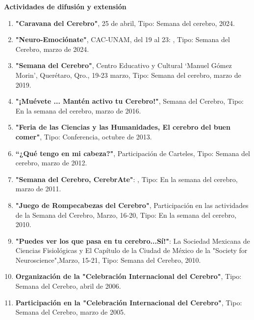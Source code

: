 \textbf{Actividades de difusión y extensión}

\begin{enumerate}

\item \textbf{"Caravana del Cerebro"}, 25 de abril, Tipo: Semana del cerebro, 2024.

\item \textbf{"Neuro-Emociónate"}, CAC-UNAM, del 19 al 23: , Tipo: Semana del Cerebro, marzo de 2024.

\item  \textbf{"Semana del Cerebro"}, Centro Educativo y Cultural ‘Manuel Gómez Morin’, Querétaro, Qro., 19-23 marzo, Tipo: Semana del 
cerebro, marzo de 2019.

\item  \textbf{"¡Muévete ... Mantén activo tu Cerebro!"}, Semana del Cerebro, Tipo: En la semana del cerebro, marzo de 2016.

\item  \textbf{"Feria de las Ciencias y las Humanidades, El cerebro del buen comer"}, Tipo: Conferencia, octubre de 2013.

\item  \textbf{“¿Qué tengo en mi cabeza?"}, Participación de Carteles, Tipo: Semana del cerebro, marzo de 2012.

\item  \textbf{"Semana del Cerebro, CerebrAte"}: , Tipo: En la semana del cerebro, marzo de 2011.

\item  \textbf{"Juego de Rompecabezas del Cerebro"}, Participación en las actividades de la Semana del Cerebro, Marzo, 16-20, Tipo: En 
la 
semana del cerebro, 2010.

\item  \textbf{"Puedes ver los que pasa en tu cerebro...Sí!"}: La Sociedad Mexicana de Ciencias Fisiológicas y El Capítulo de la Ciudad 
de 
México de la "Society for Neuroscience",Marzo, 15-21, Tipo: Semana del Cerebro, 2010.

\item  \textbf{Organización de la "Celebración Internacional del Cerebro"}, Tipo: Semana del Cerebro, abril de 2006.

\item  \textbf{Participación en la "Celebración Internacional del Cerebro"}, Tipo: Semana del Cerebro, marzo de 2005.

\end{enumerate}
